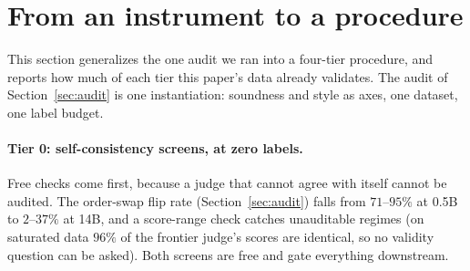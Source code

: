 \section{From an instrument to a procedure}
\label{sec:procedure}

This section generalizes the one audit we ran into a four-tier procedure, and reports how much of each tier this paper's data already validates.
The audit of Section~\ref{sec:audit} is one instantiation: soundness and style as axes, one dataset, one label budget.

\paragraph{Tier 0: self-consistency screens, at zero labels.}
Free checks come first, because a judge that cannot agree with itself cannot be audited.
The order-swap flip rate (Section~\ref{sec:audit}) falls from $71$--$95\%$ at 0.5B to $2$--$37\%$ at 14B, and a score-range check catches unauditable regimes (on saturated data $96\%$ of the frontier judge's scores are identical, so no validity question can be asked).
Both screens are free and gate everything downstream.

